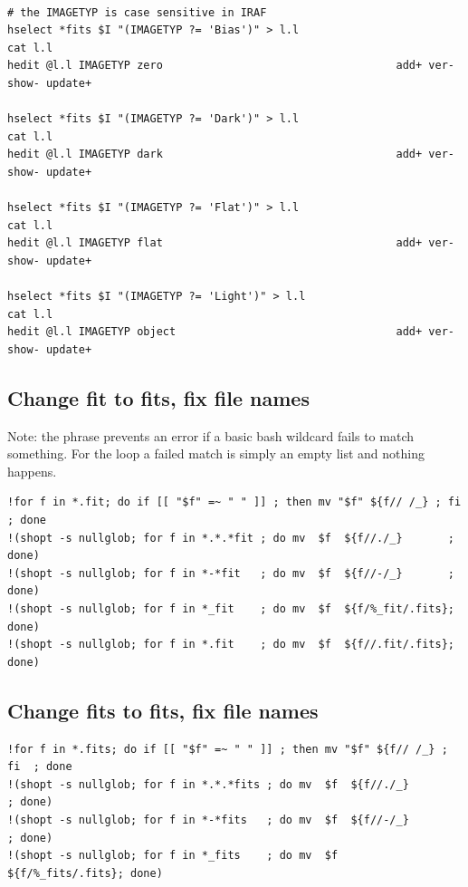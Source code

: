 \documentclass[letter,11pt,oneside]{article}
\newcommand{\dhl}[1]{{\color{verbcolor}{\texttt#1}}}
\begin{document}
{\color{verbcolor}
\begin{verbatim}

# the IMAGETYP is case sensitive in IRAF
hselect *fits $I "(IMAGETYP ?= 'Bias')" > l.l
cat l.l
hedit @l.l IMAGETYP zero                                    add+ ver- show- update+

hselect *fits $I "(IMAGETYP ?= 'Dark')" > l.l
cat l.l
hedit @l.l IMAGETYP dark                                    add+ ver- show- update+

hselect *fits $I "(IMAGETYP ?= 'Flat')" > l.l
cat l.l
hedit @l.l IMAGETYP flat                                    add+ ver- show- update+

hselect *fits $I "(IMAGETYP ?= 'Light')" > l.l
cat l.l
hedit @l.l IMAGETYP object                                  add+ ver- show- update+

\end{verbatim}
}

\subsection{Change fit to fits, fix file names}

Note: the \dhl{shopt -s nullglob} phrase prevents an error if a 
basic bash wildcard fails to match something. For the \dhl{for}
loop a failed match is simply an empty list and nothing happens.

{\color{verbcolor}
\begin{verbatim}
!for f in *.fit; do if [[ "$f" =~ " " ]] ; then mv "$f" ${f// /_} ; fi ; done
!(shopt -s nullglob; for f in *.*.*fit ; do mv  $f  ${f//./_}       ; done)
!(shopt -s nullglob; for f in *-*fit   ; do mv  $f  ${f//-/_}       ; done)
!(shopt -s nullglob; for f in *_fit    ; do mv  $f  ${f/%_fit/.fits}; done)
!(shopt -s nullglob; for f in *.fit    ; do mv  $f  ${f//.fit/.fits}; done)
\end{verbatim}
}
\subsection{Change fits to fits, fix file names}

{\color{verbcolor}
\begin{verbatim}
!for f in *.fits; do if [[ "$f" =~ " " ]] ; then mv "$f" ${f// /_} ; fi  ; done
!(shopt -s nullglob; for f in *.*.*fits ; do mv  $f  ${f//./_}        ; done)
!(shopt -s nullglob; for f in *-*fits   ; do mv  $f  ${f//-/_}        ; done)
!(shopt -s nullglob; for f in *_fits    ; do mv  $f  ${f/%_fits/.fits}; done)
\end{verbatim}
}
\end{document}
